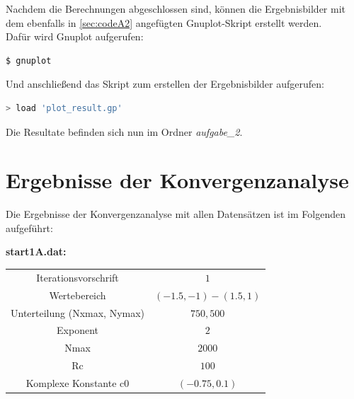 \documentclass{report}
\begin{document}
Nachdem die Berechnungen abgeschlossen sind, können die Ergebnisbilder mit dem ebenfalls in \ref{sec:codeA2} angefügten Gnuplot-Skript erstellt werden. \\
Dafür wird Gnuplot aufgerufen:

\begin{lstlisting}[language=bash]
  $ gnuplot
\end{lstlisting}

Und anschließend das Skript zum erstellen der Ergebnisbilder aufgerufen:

\begin{lstlisting}[language=bash]
  > load 'plot_result.gp'
\end{lstlisting}

Die Resultate befinden sich nun im Ordner \textit{aufgabe\_2}.

\section{Ergebnisse der Konvergenzanalyse}\label{sec:ergebnisseA2}
Die Ergebnisse der Konvergenzanalyse mit allen Datensätzen ist im Folgenden aufgeführt:

\clearpage{}
\textbf{start1A.dat:}

\begin{center}
\begin{tabular}{c|c}
Iterationsvorschrift & $1$ \\
\cline{1-2}
Wertebereich & $(-1.5, -1) - (1.5, 1)$ \\
\cline{1-2}
Unterteilung (Nxmax, Nymax) & $750, 500$ \\
\cline{1-2}
Exponent & $2$  \\
\cline{1-2}
Nmax & $2000$ \\
\cline{1-2}
Rc & $100$ \\
\cline{1-2}
Komplexe Konstante c0 & $(-0.75, 0.1)$ \\
\cline{1-2}
\end{tabular}
\label{tab:resA2_1}
\end{center}
\end{document}
